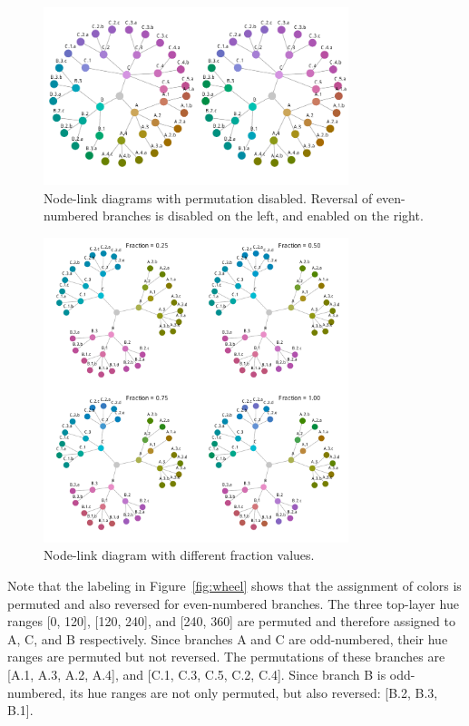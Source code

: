 \documentclass[journal]{vgtc}                %
\begin{document}
\begin{figure}[!t]

  \centering
  \includegraphics[width=3.5in]{HCPgraph2.pdf}
  \caption{Node-link diagrams with permutation disabled. Reversal of even-numbered branches is disabled on the left, and enabled on the right.}\label{fig:graph_noperm}

\end{figure}

\begin{figure}[!b]
  \centering
  \includegraphics[width=3.5in]{Graph_hue.pdf}
  \caption{Node-link diagram with different fraction values.}\label{fig:graphf}
\end{figure}

Note that the labeling in Figure~\ref{fig:wheel} shows that the assignment of colors is permuted and also reversed for even-numbered branches. The three top-layer hue ranges [0, 120], [120, 240], and [240, 360] are permuted and therefore assigned to A, C, and B respectively. Since branches A and C are odd-numbered, their hue ranges are permuted but not reversed. The permutations of these branches are [A.1, A.3, A.2, A.4], and [C.1, C.3, C.5, C.2, C.4]. Since branch B is odd-numbered, its hue ranges are not only permuted, but also reversed: [B.2, B.3, B.1].
\end{document}
